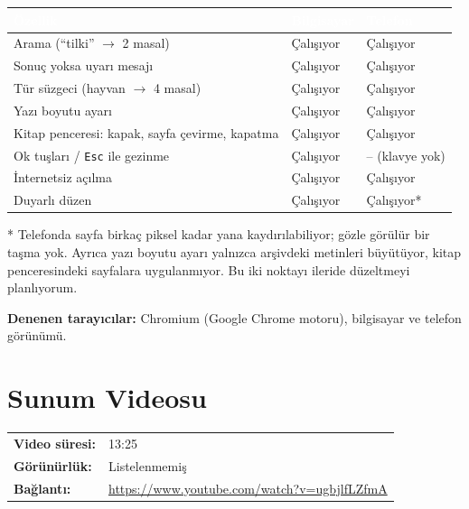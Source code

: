 \documentclass[12pt,a4paper]{article}
\newcommand{\youtubelink}{\url{https://www.youtube.com/watch?v=ugbjlfLZfmA}}
\newcommand{\videosuresi}{13:25}   %
\newcommand{\videogorunurluk}{Listelenmemiş}
\begin{document}
\begin{center}
\begin{tabular}{@{}p{6cm}p{3.4cm}p{3.4cm}@{}}
\toprule
\rowcolor{ana}\textcolor{white}{\textbf{Özellik}} & \textcolor{white}{\textbf{Bilgisayar}} & \textcolor{white}{\textbf{Telefon}} \\
\midrule
Arama (``tilki'' $\rightarrow$ 2 masal) & Çalışıyor & Çalışıyor \\
Sonuç yoksa uyarı mesajı & Çalışıyor & Çalışıyor \\
Tür süzgeci (hayvan $\rightarrow$ 4 masal) & Çalışıyor & Çalışıyor \\
Yazı boyutu ayarı & Çalışıyor & Çalışıyor \\
Kitap penceresi: kapak, sayfa çevirme, kapatma & Çalışıyor & Çalışıyor \\
Ok tuşları / \texttt{Esc} ile gezinme & Çalışıyor & -- (klavye yok) \\
İnternetsiz açılma & Çalışıyor & Çalışıyor \\
Duyarlı düzen & Çalışıyor & Çalışıyor* \\
\bottomrule
\end{tabular}
\end{center}
* Telefonda sayfa birkaç piksel kadar yana kaydırılabiliyor; gözle görülür bir taşma yok.
Ayrıca yazı boyutu ayarı yalnızca arşivdeki metinleri büyütüyor, kitap penceresindeki
sayfalara uygulanmıyor. Bu iki noktayı ileride düzeltmeyi planlıyorum.

\textbf{Denenen tarayıcılar:} Chromium (Google Chrome motoru), bilgisayar ve telefon görünümü.

\section{Sunum Videosu}
\begin{center}
\begin{tabular}{@{}ll@{}}
\textbf{Video süresi:} & \videosuresi \\
\textbf{Görünürlük:} & \videogorunurluk \\
\textbf{Bağlantı:} & \youtubelink \\
\end{tabular}
\end{center}
\end{document}
